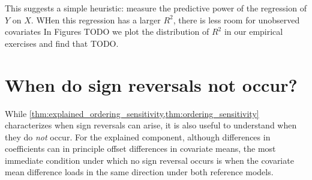 This suggests a simple heuristic: measure the predictive power of the regression of \( Y \) on \( X \).
WHen this regression has a larger \( R^2 \), there is less room for unobserved covariates 
In Figures TODO we plot the distribution of \( R^2 \) in our empirical exercises and find that TODO.

%
%    
%
%
%


\section{When do sign reversals not occur?}
\label{sec:no_sign_flips}
While \cref{thm:explained_ordering_sensitivity,thm:ordering_sensitivity} characterizes when sign reversals can arise, it is also useful to understand when they do \emph{not} occur. 
For the explained component, although differences in coefficients can in principle offset differences in covariate means, the most immediate condition under which no sign reversal occurs is when the covariate mean difference loads in the same direction under both reference models.

